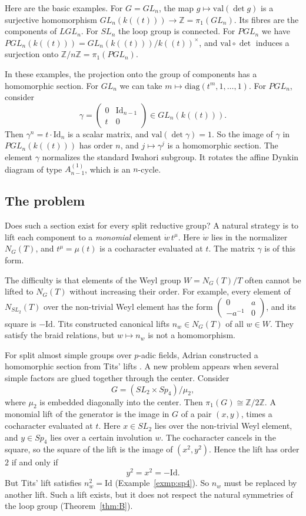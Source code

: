 \documentclass[psamsfonts]{amsart}
\theoremstyle{definition}
\theoremstyle{remark}
\numberwithin{equation}{section}
\newcommand{\Z}{\mathbb{Z}}   %
\newcommand{\wdo}{\dot{w}}
\newcommand{\diag}{\text{diag}}
\newcommand{\val}{\textrm{val}} %
\newcommand{\ra}{\rightarrow}
\numberwithin{equation}{section}
\newcommand{\Id}{\mathrm{Id}}
\theoremstyle{plain}
\begin{document}
Here are the basic examples. For $G=GL_n$, the map $g\mapsto\val(\det g)$ is a surjective homomorphism $GL_n(k(\!(t)\!))\ra\Z=\pi_1(GL_n)$. Its fibres are the components of $LGL_n$. For $SL_n$ the loop group is connected. For $PGL_n$ we have $PGL_n(k(\!(t)\!))=GL_n(k(\!(t)\!))/k(\!(t)\!)^\times$, and $\val\circ\det$ induces a surjection onto $\Z/n\Z=\pi_1(PGL_n)$.

In these examples, the projection onto the group of components has a homomorphic section. For $GL_n$ we can take $m\mapsto\diag(t^m,1,\dots,1)$. For $PGL_n$, consider
\[
\gamma=\begin{pmatrix}0&\Id_{n-1}\\ t&0\end{pmatrix}\in GL_n(k(\!(t)\!)).
\]
Then $\gamma^n=t\cdot\Id_n$ is a scalar matrix, and $\val(\det\gamma)=1$. So the image of $\gamma$ in $PGL_n(k(\!(t)\!))$ has order $n$, and $j\mapsto\gamma^j$ is a homomorphic section. The element $\gamma$ normalizes the standard Iwahori subgroup. It rotates the affine Dynkin diagram of type $A_{n-1}^{(1)}$, which is an $n$-cycle.

\subsection{The problem}
Does such a section exist for every split reductive group? A natural strategy is to lift each component to a \emph{monomial} element $\wdo\,t^{\mu}$. Here $\wdo$ lies in the normalizer $N_G(T)$, and $t^{\mu}=\mu(t)$ is a cocharacter evaluated at $t$. The matrix $\gamma$ is of this form.

The difficulty is that elements of the Weyl group $W=N_G(T)/T$ often cannot be lifted to $N_G(T)$ without increasing their order. For example, every element of $N_{SL_2}(T)$ over the non-trivial Weyl element has the form $\left(\begin{smallmatrix}0&a\\-a^{-1}&0\end{smallmatrix}\right)$, and its square is $-\Id$. Tits \cite{Ti66} constructed canonical lifts $n_w\in N_G(T)$ of all $w\in W$. They satisfy the braid relations, but $w\mapsto n_w$ is not a homomorphism.

For split almost simple groups over $p$-adic fields, Adrian constructed a homomorphic section from Tits' lifts \cite[Theorem~3.5]{Ad}. A new problem appears when several simple factors are glued together through the center. Consider
\[
G=(SL_2\times Sp_4)/\mu_2,
\]
where $\mu_2$ is embedded diagonally into the center. Then $\pi_1(G)\cong\Z/2\Z$. A monomial lift of the generator is the image in $G$ of a pair $(x,y)$, times a cocharacter evaluated at $t$. Here $x\in SL_2$ lies over the non-trivial Weyl element, and $y\in Sp_4$ lies over a certain involution $w$. The cocharacter cancels in the square, so the square of the lift is the image of $(x^2,y^2)$. Hence the lift has order $2$ if and only if
\[
y^2=x^2=-\Id.
\]
But Tits' lift satisfies $n_w^2=\Id$ (Example~\ref{exmp:sp4}). So $n_w$ must be replaced by another lift. Such a lift exists, but it does not respect the natural symmetries of the loop group (Theorem~\ref{thm:B}).
\end{document}
